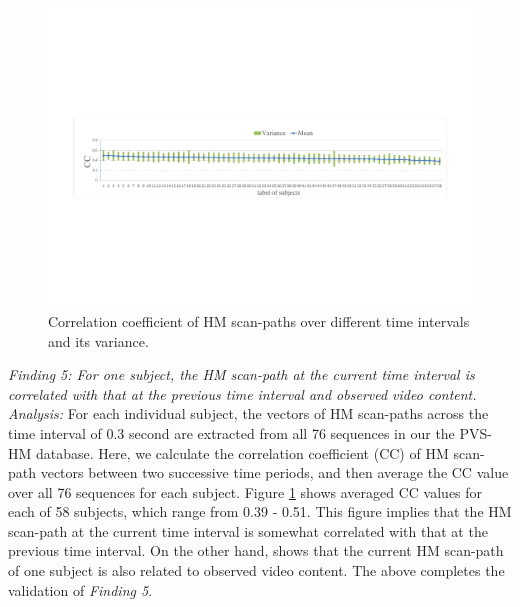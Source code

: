 \documentclass[10pt,journal,compsoc]{IEEEtran}
\begin{document}
\begin{figure}
	\begin{center}
		\centerline{\includegraphics[width=.9\columnwidth]{figures/database/consi_on_time}}%
		\caption{\footnotesize{Correlation coefficient of HM scan-paths over different time intervals and its variance. }}
		\label{consi_on_time}
	\end{center}
\end{figure}

\emph{Finding 5: For one subject, the HM scan-path at the current time interval is correlated with that at the previous time interval and observed video content. }
\\ \textit{Analysis:} For each individual subject, the vectors of HM scan-paths across the time interval of 0.3 second are extracted from all 76 sequences in our the PVS-HM database. Here, we calculate the correlation coefficient (CC) of HM scan-path vectors between two successive time periods, and then average the CC value over all 76 sequences for each subject. Figure \ref{consi_on_time} shows averaged CC values for each of 58 subjects, which range from 0.39 - 0.51. This figure implies that the HM scan-path at the current time interval is somewhat correlated with that at the previous time interval. On the other hand, \cite{hu2017deep} shows that the current HM scan-path of one subject is also related to observed video content. The above completes the validation of \textit{Finding 5}.
\end{document}
